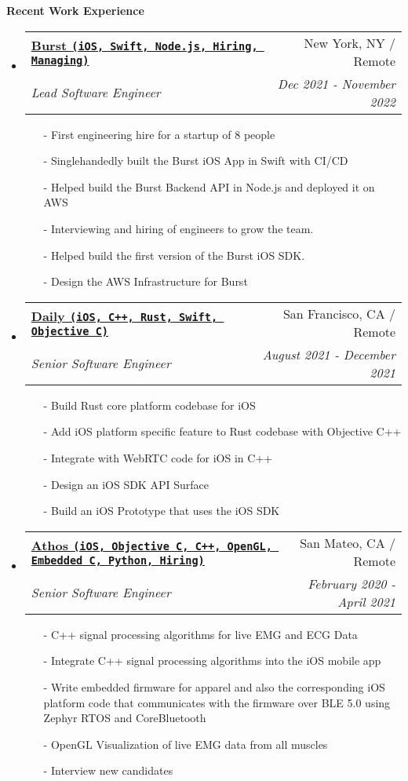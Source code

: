 \documentclass[letterpaper,11pt]{article}
\makeatletter
\newcommand{\resheading}[1]{{\large \colorbox{mygrey}{\begin{minipage}{\textwidth}{\textbf{#1 \vphantom{p\^{E}}}}\end{minipage}}}}
\newcommand{\ressubheading}[4]{
\begin{tabular*}{7.0in}{l@{\extracolsep{\fill}}r}
    \textbf{#1} & #2 \\
    \textit{#3} & \textit{#4} \\
\end{tabular*}\vspace{-6pt}}
\makeatother
\begin{document}
\resheading{Recent Work Experience}
\begin{itemize}

\item
    \ressubheading{\href{https://www.joinburst.com}{Burst \texttt{(iOS, Swift, Node.js, Hiring, Managing)}}}{New York, NY / Remote}{Lead Software Engineer}{Dec 2021 - November 2022 }
    \begin{itemize}
        \item[-]{First engineering hire for a startup of 8 people}
        \item[-]{Singlehandedly built the Burst iOS App in Swift with CI/CD}
        \item[-]{Helped build the Burst Backend API in Node.js and deployed it on AWS}
        \item[-]{Interviewing and hiring of engineers to grow the team.}
        \item[-]{Helped build the first version of the Burst iOS SDK.}
        \item[-]{Design the AWS Infrastructure for Burst}
    \end{itemize}

\item
    \ressubheading{\href{https://daily.co}{Daily \texttt{(iOS, C++, Rust, Swift, Objective C)}}}{San Francisco, CA / Remote}{Senior Software Engineer}{August 2021 - December 2021 }
    \begin{itemize}
        \item[-]{Build Rust core platform codebase for iOS}
        \item[-]{Add iOS platform specific feature to Rust codebase with Objective C++}
        \item[-]{Integrate with WebRTC code for iOS in C++}
        \item[-]{Design an iOS SDK API Surface}
        \item[-]{Build an iOS Prototype that uses the iOS SDK}
    \end{itemize}

\item
    \ressubheading{\href{https://www.crunchbase.com/organization/athos}{Athos \texttt{(iOS, Objective C, C++, OpenGL, Embedded C, Python, Hiring)}}}{San Mateo, CA / Remote}{Senior Software Engineer}{February 2020 - April 2021}
    \begin{itemize}
        \item[-]{C++ signal processing algorithms for live EMG and ECG Data}
        \item[-]{Integrate C++ signal processing algorithms into the iOS mobile app}
        \item[-]{Write embedded firmware for apparel and also the corresponding iOS platform code that communicates with the firmware over BLE 5.0 using Zephyr RTOS and CoreBluetooth}
        \item[-]{OpenGL Visualization of live EMG data from all muscles}
        \item[-]{Interview new candidates}
    \end{itemize}




\end{itemize}
\end{document}
